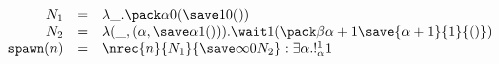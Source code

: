 \[
\begin{array}{rcl}
 N_1 & = & {\lambda \_. \pack \alpha 0 {(\save 1 0 {()})}}\\
 N_2 & = & {\lambda (\_,(\alpha,\save \alpha 1 {()})). \wait 1 {(\pack \beta {\alpha + 1} {\save {\alpha + 1} {1} {()}})}}\\
\texttt{spawn}(n) &=& \nrec {n} {N_1} {\save \infty 0 {N_2}}  : \exists \alpha . !_\alpha^1 1
\end{array}
\]
